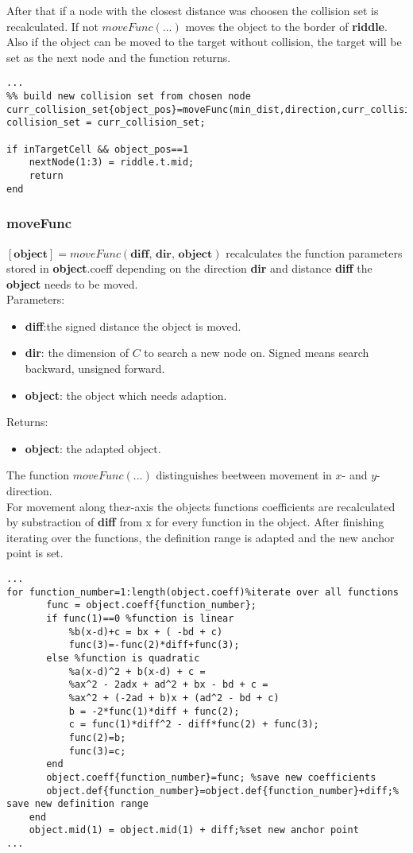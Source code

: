 After that if a node with the closest distance was choosen the collision set is recalculated. If not $moveFunc(...)$ moves the object to the border of \textbf{riddle}.
Also if the object can be moved to the target without collision, the target will be set as the next node and the function returns.
\begin{lstlisting}
...
%% build new collision set from chosen node
curr_collision_set{object_pos}=moveFunc(min_dist,direction,curr_collision_set{object_pos});
collision_set = curr_collision_set;

if inTargetCell && object_pos==1
    nextNode(1:3) = riddle.t.mid;
    return
end
\end{lstlisting}

\subsubsection{moveFunc}
$[\textbf{object}]=moveFunc(\textbf{diff, dir, object})$ recalculates the function parameters stored in \textbf{object}.coeff depending on the direction \textbf{dir} and distance \textbf{diff}  the \textbf{object} needs to be moved.\\
Parameters:
\begin{itemize}
\item \textbf{diff}:the signed distance the object is moved.
\item \textbf{dir}: the dimension of $C$ to search a new node on. Signed means search backward, unsigned forward. 
\item \textbf{object}: the object which needs adaption.
\end{itemize}
Returns:
\begin{itemize}
\item \textbf{object}: the adapted object.
\end{itemize}
The function $moveFunc(...)$ distinguishes beetween movement in $x$- and $y$-direction.\\
 For movement along the$x$-axis the objects functions coefficients are recalculated by substraction of \textbf{diff} from x for every function in the object. After finishing iterating over the functions, the definition range is adapted and the new anchor point is set.
\begin{lstlisting}
...
for function_number=1:length(object.coeff)%iterate over all functions
       func = object.coeff{function_number};
       if func(1)==0 %function is linear
           %b(x-d)+c = bx + ( -bd + c)
           func(3)=-func(2)*diff+func(3);  
       else %function is quadratic
           %a(x-d)^2 + b(x-d) + c =
           %ax^2 - 2adx + ad^2 + bx - bd + c =
           %ax^2 + (-2ad + b)x + (ad^2 - bd + c)
           b = -2*func(1)*diff + func(2);
           c = func(1)*diff^2 - diff*func(2) + func(3);
           func(2)=b;
           func(3)=c;
       end
       object.coeff{function_number}=func; %save new coefficients
       object.def{function_number}=object.def{function_number}+diff;% save new definition range
    end
    object.mid(1) = object.mid(1) + diff;%set new anchor point
...
\end{lstlisting}
